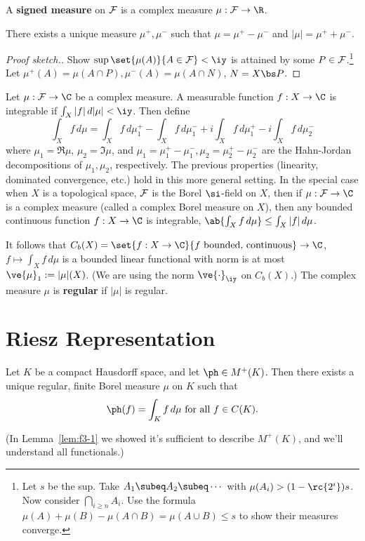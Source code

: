 A \textbf{signed measure} on $\cal F$ is a complex measure $\mu:\cal F\to \R$.
\begin{thm} There exists a unique measure $\mu^+,\mu^-$ such that $\mu=\mu^+-\mu^-$ and $|\mu|=\mu^++\mu^-$.
\end{thm} 
\begin{proof}[Proof sketch.]
Show $\sup\set{\mu(A)}{A\in \cal F}<\iy$ is attained by some $P\in \cal F$.\footnote{Let $s$ be the sup. Take $A_1\subeq A_2\subeq \cdots$ with $\mu(A_i)>(1-\rc{2^i})s$. Now consider $\bigcap_{i\ge n}A_i$. Use the formula $\mu(A)+\mu(B)-\mu(A\cap B)=\mu(A\cup B)\le s$ to show their measures converge.} Let $\mu^+(A)=\mu(A\cap P),\mu^-(A)=\mu(A\cap N)$, $N=X\bs P$.
\end{proof}
Let $\mu:\cal F\to \C$ be a complex measure. A measurable function $f:X\to \C$ is integrable if $\int_X|f|\,d|\mu|<\iy$. Then define
\[
\int_X f\,d\mu = \int_X f\,d\mu_1^+-\int_Xf\,d\mu_1^-+i\int_Xf\,d\mu_1^+-i\int_X f\,d\mu_2^-
\]
where $\mu_1=\Re \mu$, $\mu_2=\Im \mu$, and $\mu_1=\mu_1^+-\mu_1^-,\mu_2=\mu_2^+-\mu_2^-$ are the Hahn-Jordan decompositions of $\mu_1,\mu_2$, respectively. The previous properties (linearity, dominated convergence, etc.) hold in this more general setting. In the special case when $X$ is a topological space, $\cal F$ is the Borel $\si$-field on $X$, then if $\mu:\cal F\to \C$ is a complex measure (called a complex Borel measure on $X$), then any bounded continuous function $f:X\to \C$ is integrable, $\ab{\int_X f\,d\mu}\le \int_X|f|\,d\mu$.

It follows that $C_b(X)=\set{f:X\to \C}{f\text{ bounded, continuous}}\to \C$, $f\mapsto \int_X f\,d\mu$ is a bounded linear functional with norm is at most $\ve{\mu}_1:=|\mu|(X)$.  (We are using the norm $\ve{\cdot}_{\iy}$ on $C_b(X)$.) 
The complex measure $\mu$ is \textbf{regular} if $|\mu|$ is regular.

\section{Riesz Representation}
\begin{thm}
Let $K$ be a compact Hausdorff space, and let $\ph\in M^+(K)$. Then there exists a unique regular, finite %
Borel measure $\mu$ on $K$ such that 
\[
\ph(f)=\int_K f\,d\mu \text{ for all } f\in C(K).
\]
\end{thm}
(In Lemma~\ref{lem:f3-1} we showed it's sufficient to describe $M^+(K)$, and we'll understand all functionals.)


